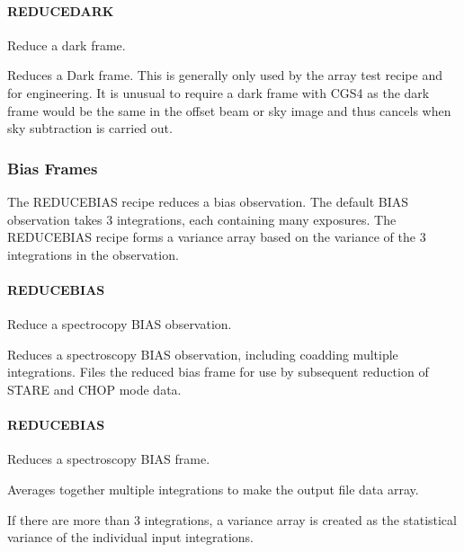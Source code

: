 \documentclass[twoside,11pt]{article}
\renewcommand{\_}{\texttt{\symbol{95}}}
\begin{document}
\paragraph{REDUCE\_DARK\label{REDUCE_DARK}}


Reduce a dark frame.


\mbox{}


Reduces a Dark frame. This is generally only used by the array test
recipe and for engineering. It is unusual to require a dark frame with CGS4 as
the dark frame would be the same in the offset beam or sky image and
thus cancels when sky subtraction is carried out.


\subsubsection{Bias Frames}

The REDUCE\_BIAS recipe reduces a bias observation. The default BIAS
observation takes 3 integrations, each containing many exposures. The
REDUCE\_BIAS recipe forms a variance array based on the variance of the
3 integrations in the observation.


\paragraph{REDUCE\_BIAS\label{REDUCE_BIAS}}


Reduce a spectrocopy BIAS observation.


\mbox{}


Reduces a spectroscopy BIAS observation, including coadding multiple
integrations. Files the reduced bias frame for use by subsequent
reduction of STARE and CHOP mode data.


\paragraph{\_REDUCE\_BIAS\_\label{_REDUCE_BIAS_}}


Reduces a spectroscopy BIAS frame.


\mbox{}


Averages together multiple integrations to make the output file data array.



If there are more than 3 integrations, a variance array is created as the
statistical variance of the individual input integrations.
\end{document}
